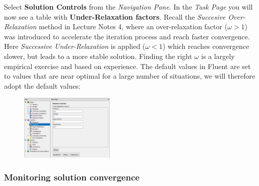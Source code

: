 \documentclass[11pt,a4paper,oneside]{scrartcl}
\newcommand\bfr[1]{\textcolor[rgb]{1,0.00,0.00}{\textbf{\textsf{#1}}}}
\begin{document}
Select \bfr{Solution Controls} from the \emph{Navigation Pane}. In the \emph{Task Page} you will now see a table with \bfr{Under-Relaxation factors}. Recall the \emph{Succesive Over-Relaxation}  method in Lecture Notes 4, where an over-relaxation factor ($\omega>1$) was introduced to accelerate the iteration process and reach faster convergence. Here \emph{Successive Under-Relaxation} is applied ($\omega<1$) which reaches convergence slower, but leads to a more stable solution. Finding the right $\omega$ is a largely empirical exercise and based on experience. The default values in Fluent are set to values that are near optimal for a large number of situations, we will therefore adopt the default values:
\begin{figure}[H]
\begin{center}
\includegraphics[width=0.4\textwidth,clip]{under_relaxation_factors.png}
\end{center}
\end{figure}


\subsubsection{Monitoring solution convergence}
\end{document}
